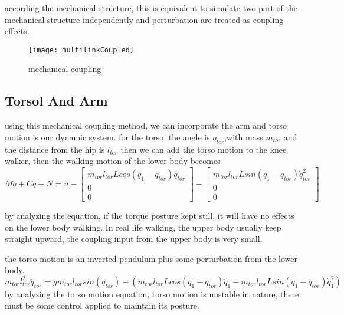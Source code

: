 {according the mechanical structure, this is equivalent to simulate two part of the mechanical structure independently and perturbation are treated as coupling effects.
\begin{figure}[!htbp]
  \begin{center}
      \texttt{[image: multilinkCoupled]}
    \caption{mechanical coupling}
    \label{fig:mechcouple}
\end{center}
\end{figure}








\subsection{Torsol And Arm}
using this mechanical coupling method, we can incorporate the arm and torso motion is our dynamic system.
for the torso, the angle is $q_{tor}$,with mass $m_{tor}$ and the distance from the hip is $l_{tor}$
then we can add the torso motion to the knee walker, then the walking motion of the lower body becomes
\begin{equation}
\label{eq:walkcouplewithtorso}
M\ddot{q}+C\dot{q}+N=u-\left[\begin{array}{c}
m_{tor}l_{tor}Lcos(q_{1}-q_{tor})\ddot{q}_{tor}\\
0\\
0\end{array}\right]-\left[\begin{array}{c}
m_{tor}l_{tor}Lsin(q_{1}-q_{tor})\dot{q}_{tor}^{2}\\
0\\
0\end{array}\right]
\end{equation}

by analyzing the equation, if the torque posture kept still, it will have no effects on the lower body walking.
In real life walking, the upper body usually keep straight upward, the coupling input from the upper body is very small.



the torso motion is an inverted pendulum plus some perturbation from the lower body.
\[
m_{tor}l_{tor}^{2}\ddot{q}_{tor}=gm_{tor}l_{tor}sin(q_{tor})-(m_{tor}l_{tor}Lcos(q_{1}-q_{tor})\ddot{q}_{1}-m_{tor}l_{tor}Lsin(q_{1}-q_{tor})\dot{q}_{1}^{2})
\]
by analyzing the torso motion equation, torso motion is unstable in nature, there must be some control applied to maintain its posture.

}
